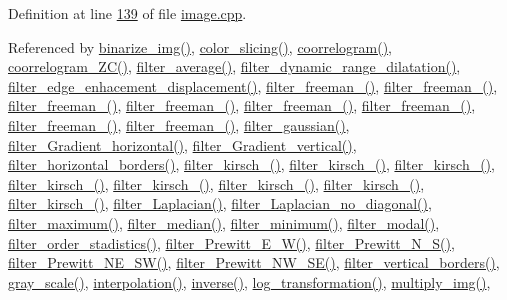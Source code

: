 Definition at line \hyperlink{image_8cpp_source_l00139}{139} of file \hyperlink{image_8cpp_source}{image.\-cpp}.



Referenced by \hyperlink{image_8cpp_source_l00301}{binarize\-\_\-img()}, \hyperlink{image_8cpp_source_l01124}{color\-\_\-slicing()}, \hyperlink{image_8cpp_source_l02164}{coorrelogram()}, \hyperlink{image_8cpp_source_l02212}{coorrelogram\-\_\-\-Z\-C()}, \hyperlink{image_8cpp_source_l00803}{filter\-\_\-average()}, \hyperlink{image_8cpp_source_l01052}{filter\-\_\-dynamic\-\_\-range\-\_\-dilatation()}, \hyperlink{image_8cpp_source_l00662}{filter\-\_\-edge\-\_\-enhacement\-\_\-displacement()}, \hyperlink{image_8cpp_source_l01510}{filter\-\_\-freeman\-\_()}, \hyperlink{image_8cpp_source_l01545}{filter\-\_\-freeman\-\_()}, \hyperlink{image_8cpp_source_l01580}{filter\-\_\-freeman\-\_()}, \hyperlink{image_8cpp_source_l01615}{filter\-\_\-freeman\-\_()}, \hyperlink{image_8cpp_source_l01650}{filter\-\_\-freeman\-\_()}, \hyperlink{image_8cpp_source_l01686}{filter\-\_\-freeman\-\_()}, \hyperlink{image_8cpp_source_l01722}{filter\-\_\-freeman\-\_()}, \hyperlink{image_8cpp_source_l01757}{filter\-\_\-freeman\-\_()}, \hyperlink{image_8cpp_source_l00841}{filter\-\_\-gaussian()}, \hyperlink{image_8cpp_source_l00436}{filter\-\_\-\-Gradient\-\_\-horizontal()}, \hyperlink{image_8cpp_source_l00473}{filter\-\_\-\-Gradient\-\_\-vertical()}, \hyperlink{image_8cpp_source_l00711}{filter\-\_\-horizontal\-\_\-borders()}, \hyperlink{image_8cpp_source_l01228}{filter\-\_\-kirsch\-\_()}, \hyperlink{image_8cpp_source_l01335}{filter\-\_\-kirsch\-\_()}, \hyperlink{image_8cpp_source_l01370}{filter\-\_\-kirsch\-\_()}, \hyperlink{image_8cpp_source_l01405}{filter\-\_\-kirsch\-\_()}, \hyperlink{image_8cpp_source_l01440}{filter\-\_\-kirsch\-\_()}, \hyperlink{image_8cpp_source_l01475}{filter\-\_\-kirsch\-\_()}, \hyperlink{image_8cpp_source_l01264}{filter\-\_\-kirsch\-\_()}, \hyperlink{image_8cpp_source_l01300}{filter\-\_\-kirsch\-\_()}, \hyperlink{image_8cpp_source_l00347}{filter\-\_\-\-Laplacian()}, \hyperlink{image_8cpp_source_l00393}{filter\-\_\-\-Laplacian\-\_\-no\-\_\-diagonal()}, \hyperlink{image_8cpp_source_l01795}{filter\-\_\-maximum()}, \hyperlink{image_8cpp_source_l00747}{filter\-\_\-median()}, \hyperlink{image_8cpp_source_l01838}{filter\-\_\-minimum()}, \hyperlink{image_8cpp_source_l00898}{filter\-\_\-modal()}, \hyperlink{image_8cpp_source_l01873}{filter\-\_\-order\-\_\-stadistics()}, \hyperlink{image_8cpp_source_l00590}{filter\-\_\-\-Prewitt\-\_\-\-E\-\_\-\-W()}, \hyperlink{image_8cpp_source_l00520}{filter\-\_\-\-Prewitt\-\_\-\-N\-\_\-\-S()}, \hyperlink{image_8cpp_source_l00554}{filter\-\_\-\-Prewitt\-\_\-\-N\-E\-\_\-\-S\-W()}, \hyperlink{image_8cpp_source_l00626}{filter\-\_\-\-Prewitt\-\_\-\-N\-W\-\_\-\-S\-E()}, \hyperlink{image_8cpp_source_l00686}{filter\-\_\-vertical\-\_\-borders()}, \hyperlink{image_8cpp_source_l02136}{gray\-\_\-scale()}, \hyperlink{image_8cpp_source_l02005}{interpolation()}, \hyperlink{image_8cpp_source_l00994}{inverse()}, \hyperlink{image_8cpp_source_l01020}{log\-\_\-transformation()}, \hyperlink{image_8cpp_source_l00273}{multiply\-\_\-img()}, 